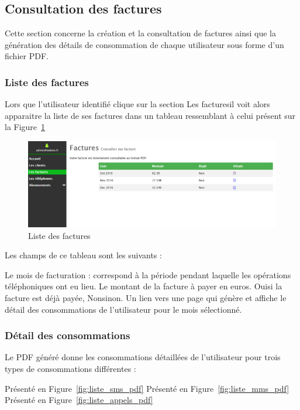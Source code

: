 \subsection{Consultation des factures}
Cette section concerne la création et la consultation de factures ainsi que la génération des détails de consommation de chaque utilisateur sous forme d'un fichier PDF.
\subsubsection{Liste des factures}
Lors que l'utilisateur identifié clique sur la section \og Les factures\fg il voit alors apparaitre la liste de ses factures dans un tableau ressemblant à celui présent sur la Figure~\ref{fig:listfacture}

\begin{figure}[ht]
  \centering
    \includegraphics[width=.95\textwidth]{images/Plateforme/liste_factures}
    \caption{Liste des factures}
    \label{fig:listfacture}
\end{figure}

Les champs de ce tableau sont les suivants :
\begin{itemize}
  Le mois de facturation : correspond à la période pendant laquelle les opérations téléphoniques ont eu lieu.
  Le montant de la facture à payer en euros.
  \og Oui\fg si la facture est déjà payée, \og Non\fg sinon.
  Un lien vers une page qui génère et affiche le détail des consommations de l'utilisateur pour le mois sélectionné.
\end{itemize}

\subsubsection{Détail des consommations}

Le PDF généré donne les consommations détaillées de l'utilisateur pour trois types de consommations différentes :
\begin{itemize}
	Présenté en Figure~\ref{fig:liste_sms_pdf}
	Présenté en Figure~\ref{fig:liste_mms_pdf}
	Présenté en Figure~\ref{fig:liste_appels_pdf}
\end{itemize}

